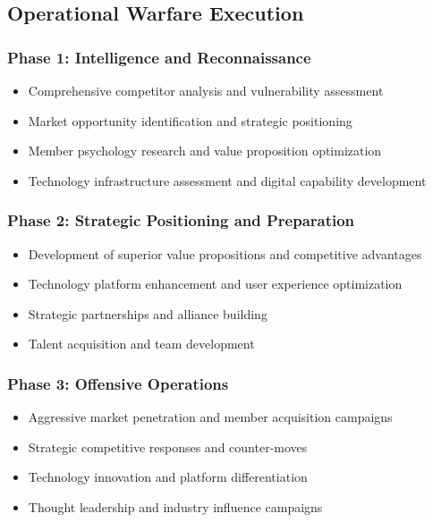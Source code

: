 \subsection{Operational Warfare Execution}

\subsubsection{Phase 1: Intelligence and Reconnaissance}
\begin{itemize}
    \item Comprehensive competitor analysis and vulnerability assessment
    \item Market opportunity identification and strategic positioning
    \item Member psychology research and value proposition optimization
    \item Technology infrastructure assessment and digital capability development
\end{itemize}

\subsubsection{Phase 2: Strategic Positioning and Preparation}
\begin{itemize}
    \item Development of superior value propositions and competitive advantages
    \item Technology platform enhancement and user experience optimization
    \item Strategic partnerships and alliance building
    \item Talent acquisition and team development
\end{itemize}

\subsubsection{Phase 3: Offensive Operations}
\begin{itemize}
    \item Aggressive market penetration and member acquisition campaigns
    \item Strategic competitive responses and counter-moves
    \item Technology innovation and platform differentiation
    \item Thought leadership and industry influence campaigns
\end{itemize}

